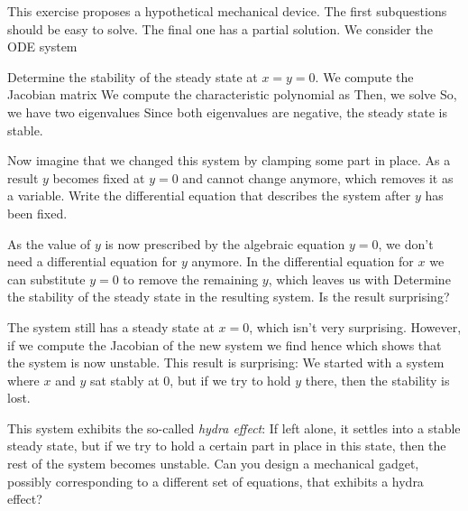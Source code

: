 This exercise proposes a hypothetical mechanical device. The first subquestions should be easy to solve. The final one has a partial solution. We consider the ODE system

\subquestion 
Determine the stability of the steady state at $x=y=0$.
\solution
We compute the Jacobian matrix
We compute the characteristic polynomial as 
Then, we solve 
So, we have two eigenvalues 
Since both eigenvalues are negative, the steady state is stable. 

\subquestion
Now imagine that we changed this system by clamping some part in place. As a result $y$ becomes fixed at $y=0$ and cannot change anymore, which removes it as a variable. Write the differential equation that describes the system after $y$ has been fixed. 

\solution
As the value of $y$ is now prescribed by the algebraic equation $y=0$, we don't need a differential equation for $y$ anymore. In the differential equation for $x$ we can substitute $y=0$ to remove the remaining $y$, which leaves us with 
\subquestion 
Determine the stability of the steady state in the resulting system. Is the result surprising?

\solution
The system still has a steady state at $x=0$, which isn't very surprising. However, if we compute the Jacobian of the new system we find
hence
which shows that the system is now unstable. This result is surprising: We started with a system where $x$ and $y$ sat stably at 0, but if we try to hold $y$ there, then the stability is lost. 

\subquestion
This system exhibits the so-called \emph{hydra effect}: If left alone, it settles into a stable steady state, but if we try to hold a certain part in place in this state, then the rest of the system becomes unstable. Can you design a mechanical gadget, possibly corresponding to a different set of equations, that exhibits a hydra effect? 

